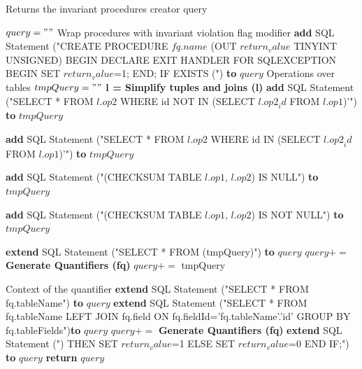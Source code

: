 \documentclass[oneside]{book}
\begin{document}
\begin{algorithm}
\caption{Returns the invariant procedures creator query}
\label{array-sum4}
\begin{algorithmic}[1]
	\State $query = ""$
		\Comment Wrap procedures with invariant violation flag modifier
		\State \textbf{add} SQL Statement ("CREATE PROCEDURE $fq.name$ (OUT $return_value$ TINYINT UNSIGNED) BEGIN DECLARE EXIT HANDLER FOR SQLEXCEPTION BEGIN SET $return_value$=1; END; IF EXISTS (") \textbf{to} $query$
			 \Comment Operations over tables
				\State $tmpQuery = ""$
				\State \textbf{l = Simplify tuples and joins (l)}
				 \State \textbf{add} SQL Statement ("SELECT * FROM $l.op2$ WHERE id NOT IN (SELECT ${l.op2}_id$ FROM $l.op1$)'") \textbf{to} $tmpQuery$
			
				 \State \textbf{add} SQL Statement ("SELECT * FROM $l.op2$ WHERE id IN (SELECT ${l.op2}_id$ FROM $l.op1$)'") \textbf{to} $tmpQuery$
			
				 \State \textbf{add} SQL Statement ("(CHECKSUM TABLE $l.op1$, $l.op2$) IS NULL") \textbf{to} $tmpQuery$
				
				 \State \textbf{add} SQL Statement ("(CHECKSUM TABLE $l.op1$, $l.op2$) IS NOT NULL") \textbf{to} $tmpQuery$
			
				\EndIf
			\EndFor
			 \State \textbf{extend} SQL Statement ("SELECT * FROM (tmpQuery)") \textbf{to} $query$
			\State $query+=$ \textbf{Generate Quantifiers (fq)}
			\Else
				\State $query+=$ tmpQuery
			\EndIf
			
		\Comment Context of the quantifier
			 \State \textbf{extend} SQL Statement ("SELECT * FROM fq.tableName") \textbf{to} $query$
				\State \textbf{extend} SQL Statement ("SELECT * FROM fq.tableName LEFT JOIN fq.field ON fq.fieldId='fq.tableName'.'id' GROUP BY fq.tableFields")\textbf{to} $query$
			\EndIf
			\State $query+=$ \textbf{Generate Quantifiers (fq)}
		\EndIf
		\State \textbf{extend} SQL Statement (") THEN SET $return_value$=1 ELSE SET $return_value$=0 END IF;") \textbf{to} $query$
	\EndFor
	\State \textbf{return} $query$
\EndFunction
\end{algorithmic}


\end{algorithm}
\end{document}
